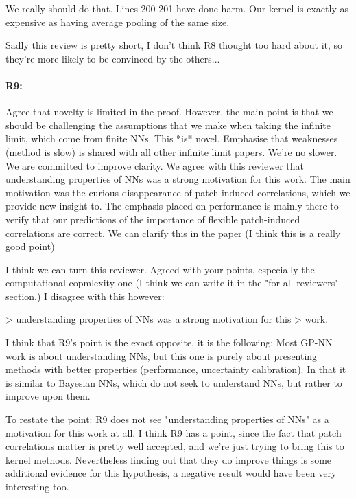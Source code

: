 \documentclass{article}
\begin{document}
We really should do that. Lines 200-201 have done harm.  Our kernel is
exactly as expensive as having average pooling of the same size.

Sadly this review is pretty short, I don't think R8 thought too hard
about it, so they're more likely to be convinced by the others...


\paragraph{R9:}
Agree that novelty is limited in the proof. However, the main point is that we should be challenging the assumptions that we make when taking the infinite limit, which come from finite NNs. This *is* novel.
Emphasise that weaknesses (method is slow) is shared with all other infinite limit papers. We're no slower.
We are committed to improve clarity.
We agree with this reviewer that understanding properties of NNs was a strong motivation for this work. The main motivation was the curious disappearance of patch-induced correlations, which we provide new insight to. The emphasis placed on performance is mainly there to verify that our predictions of the importance of flexible patch-induced correlations are correct. We can clarify this in the paper (I think this is a really good point)

I think we can turn this reviewer. Agreed with your points, especially
the computational copmlexity one (I think we can write it in the "for
all reviewers" section.) I disagree with this however:

> understanding properties of NNs was a strong motivation for this
> work.

I think that R9's point is the exact opposite, it is the following:
Most GP-NN work is about understanding NNs, but this one is purely
about presenting methods with better properties (performance,
uncertainty calibration). In that it is similar to Bayesian NNs, which
do not seek to understand NNs, but rather to improve upon them.

To restate the point: R9 does not see "understanding properties of NNs"
as a motivation for this work at all. I think R9 has a point, since the
fact that patch correlations matter is pretty well accepted, and we're
just trying to bring this to kernel methods. Nevertheless finding out
that they do improve things is some additional evidence for this
hypothesis, a negative result would have been very interesting too.
\end{document}
